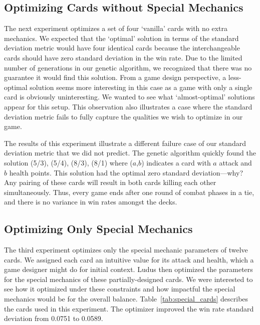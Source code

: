 
 \subsection{Optimizing Cards without Special Mechanics}

The next experiment optimizes a set of four `vanilla' cards with no extra mechanics. We expected that the `optimal' solution in terms of the standard deviation metric would have four identical cards because the interchangeable cards should have zero standard deviation in the win rate. Due to the limited number of generations in our genetic algorithm, we recognized that there was no guarantee it would find this solution. From a game design perspective, a less-optimal solution seems more interesting in this case as a game with only a single card is obviously uninteresting. We wanted to see what `almost-optimal' solutions appear for this setup. This observation also illustrates a case where the standard deviation metric fails to fully capture the qualities we wish to optimize in our game.

The results of this experiment illustrate a different failure case of our standard deviation metric that we did not predict. The genetic algorithm quickly found the solution (5/3), (5/4), (8/3), (8/1) where ($a$,$b$) indicates a card with $a$ attack and $b$ health points. This solution had the optimal zero standard deviation---why? Any pairing of these cards will result in both cards killing each other simultaneously. Thus, every game ends after one round of combat phases in a tie, and there is no variance in win rates amongst the decks. 

 \subsection{Optimizing Only Special Mechanics}

The third experiment optimizes only the special mechanic parameters of twelve cards. We assigned each card an intuitive value for its attack and health, which a game designer might do for initial context. {\sc Ludus} then optimized the parameters for the special mechanics of these partially-designed cards. We were interested to see how it %
optimized under these constraints and how impactful the special mechanics would be for the overall balance. %
Table~\ref{tab:special_cards} describes the cards used in this experiment. The optimizer improved the win rate standard deviation from 0.0751 to 0.0589. 

